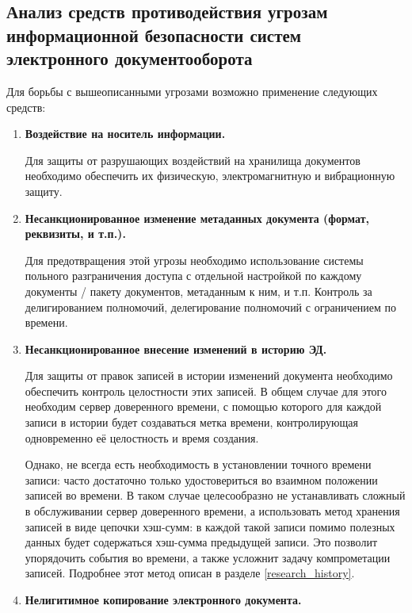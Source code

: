 \subsection{Анализ средств противодействия угрозам информационной безопасности систем электронного документооборота} \label{threats_neutralizers}

Для борьбы с вышеописанными угрозами возможно применение следующих средств:
\begin{enumerate}
	\item \textbf{Воздействие на носитель информации.}

	Для защиты от разрушающих воздействий на хранилища документов необходимо обеспечить их физическую, электромагнитную и вибрационную защиту.

	\item \textbf{Несанкционированное изменение метаданных документа (формат, реквизиты, и т.п.).}

	Для предотвращения этой угрозы необходимо использование системы польного разграничения доступа с отдельной настройкой по каждому документы / пакету документов, метаданным к ним, и т.п. Контроль за делигированием полномочий, делегирование полномочий с ограничением по времени.

	\item \textbf{Несанкционированное внесение изменений в историю ЭД.}

	Для защиты от правок записей в истории изменений документа необходимо обеспечить контроль целостности этих записей. В общем случае для этого необходим сервер доверенного времени, с помощью которого для каждой записи в истории будет создаваться метка времени, контролирующая одновременно её целостность и время создания.

	Однако, не всегда есть необходимость в установлении точного времени записи: часто достаточно только удостовериться во взаимном положении записей во времени. В таком случае целесообразно не устанавливать сложный в обслуживании сервер доверенного времени, а использовать метод хранения записей в виде цепочки хэш-сумм: в каждой такой записи помимо полезных данных будет содержаться хэш-сумма предыдущей записи. Это позволит упорядочить события во времени, а также усложнит задачу компрометации записей. Подробнее этот метод описан в разделе \ref{research_history}.

	\item \textbf{Нелигитимное копирование электронного документа.}


\end{enumerate}
